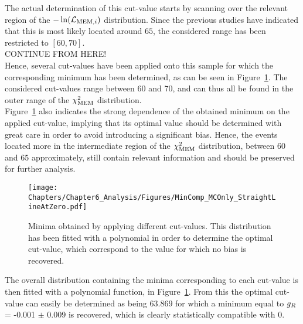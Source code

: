 The actual determination of this cut-value starts by scanning over the relevant region of the $-\ln(\mathcal{L}_{\textrm{MEM}, i})$ distribution.
Since the previous studies have indicated that this is most likely located around $65$, the considered range has been restricted to $\left[60, 70\right]$.
\\
CONTINUE FROM HERE!\\
Hence, several cut-values have been applied onto this sample for which the corresponding minimum has been determined, as can be seen in Figure~\ref{fig::CutValueFit}.
The considered cut-values range between 60 and 70, and can thus all be found in the outer range of the $\chi^{2}_{\textrm{MEM}}$ distribution.
\\
Figure~\ref{fig::CutValueFit} also indicates the strong dependence of the obtained minimum on the applied cut-value, implying that its optimal value should be determined with great care in order to avoid introducing a significant bias. Hence, the events located more in the intermediate region of the $\chi^{2}_{\textrm{MEM}}$ distribution, between $60$ and $65$ approximately, still contain relevant information and should be preserved for further analysis.
\\
\begin{figure}[h!t]
 \centering
 \texttt{[image: Chapters/Chapter6\_Analysis/Figures/MinComp\_MCOnly\_StraightLineAtZero.pdf]}  %
 \caption{Minima obtained by applying different cut-values. This distribution has been fitted with a polynomial in order to determine the optimal cut-value, which correspond to the value for which no bias is recovered.} \label{fig::CutValueFit}
\end{figure}

The overall distribution containing the minima corresponding to each cut-value is then fitted with a polynomial function, in Figure~\ref{fig::CutValueFit}.
From this the optimal cut-value can easily be determined as being $63.869$ for which a minimum equal to $g_{R}$ = -0.001 $\pm$ 0.009 is recovered, which is clearly statistically compatible with 0.


